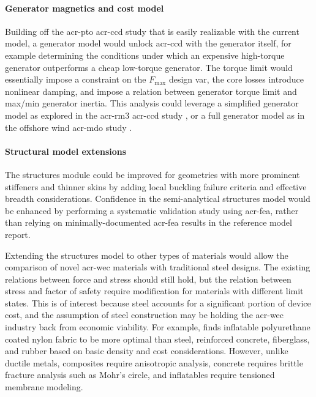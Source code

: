    \paragraph{Generator magnetics and cost model}
    Building off the \gls{acr-pto} \gls{acr-ccd} study that is easily realizable with the current model, a generator model would unlock \gls{acr-ccd}  with the generator itself, for example determining the conditions under which an expensive high-torque generator outperforms a cheap low-torque generator.
    The torque limit would essentially impose a constraint on the $F_{\text{max}}$ design var, the core losses introduce nonlinear damping, and impose a relation between generator torque limit and max/min generator inertia.
    This analysis could leverage a simplified generator model as explored in the \gls{acr-rm3} \gls{acr-ccd} study \citep{anderson_re-imagining_2024}, or a full generator model as in the offshore wind \gls{acr-mdo} study \citep{barter_beyond_2023}.
    
    \paragraph{Structural model extensions}
    The structures module could be improved for geometries with more prominent stiffeners and thinner skins by adding local buckling failure criteria and effective breadth considerations.
    Confidence in the semi-analytical structures model would be enhanced by performing a systematic validation study using \gls{acr-fea}, rather than relying on minimally-documented \gls{acr-fea} results in the reference model report.
    
    Extending the structures model to other types of materials would allow the comparison of novel \gls{acr-wec} materials with traditional steel designs.
    The existing relations between force and stress should still hold, but the relation between stress and factor of safety require modification for materials with different limit states.
    This is of interest because steel accounts for a significant portion of device cost, and the assumption of steel construction may be holding the \gls{acr-wec} industry back from economic viability.
    For example, \citet{roberts_bringing_2021} finds inflatable polyurethane coated nylon fabric to be more optimal than steel, reinforced concrete, fiberglass, and rubber based on basic density and cost considerations.
    However, unlike ductile metals, composites require anisotropic analysis, concrete requires brittle fracture analysis such as Mohr's circle, and inflatables require tensioned membrane modeling.
    
